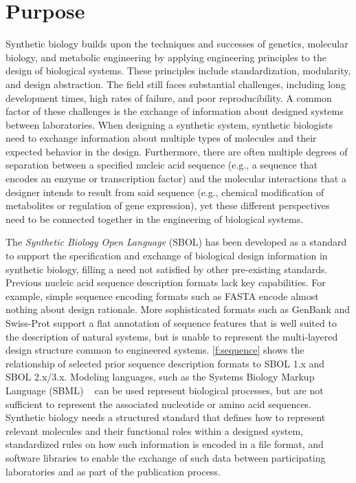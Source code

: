 \section{Purpose}

Synthetic biology builds upon the techniques and successes of genetics, molecular biology, and metabolic engineering by applying engineering principles to the design of biological systems. These principles include standardization, modularity, and design abstraction. The field still faces substantial challenges, including long development times, high rates of failure, and poor reproducibility. A common factor of these challenges is the exchange of information about designed systems between laboratories. 
When designing a synthetic system, synthetic biologists need to exchange information about multiple types of molecules and their expected behavior in the design.
Furthermore, there are often multiple degrees of separation between a specified nucleic acid sequence (e.g., a sequence that encodes an enzyme or transcription factor) and the molecular interactions that a designer intends to result from said sequence (e.g., chemical modification of metabolites or regulation of gene expression), yet these different perspectives need to be connected together in the engineering of biological systems.

The \emph{Synthetic Biology Open Language} (SBOL) has been developed as a standard to support the specification and exchange of biological design information in synthetic biology, filling a need not satisfied by other pre-existing standards.
Previous nucleic acid sequence description formats lack key capabilities. For example,  simple sequence encoding formats such as FASTA encode almost nothing about design rationale. More sophisticated formats such as GenBank and Swiss-Prot support a flat annotation of sequence features that is well suited to the  description of natural systems, but is unable to represent the multi-layered design structure common to engineered systems.
\ref{f:sequence} shows the relationship of selected prior sequence description formats to SBOL 1.x and SBOL 2.x/3.x.
Modeling languages, such as the Systems Biology Markup Language (SBML) ~\cite{SBML} can be used represent biological processes, but are not sufficient to represent the associated nucleotide or amino acid sequences.  
Synthetic biology needs a structured standard that defines how to represent relevant molecules and their functional roles within a designed system, standardized rules on how such information is encoded in a file format, and software libraries to enable the exchange of such data between participating laboratories and as part of the publication process. 

